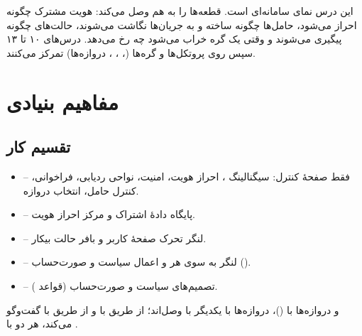 \documentclass[11pt,a4paper]{article}
\begin{document}
این درس نمای سامانه‌ای  است. قطعه‌ها را به هم وصل می‌کند: هویت مشترک چگونه احراز می‌شود، حامل‌ها چگونه
ساخته و به جریان‌ها نگاشت می‌شوند، حالت‌های  چگونه پیگیری می‌شوند و وقتی یک گره خراب می‌شود چه رخ می‌دهد.
درس‌های ۱۰ تا ۱۳ سپس روی پروتکل‌ها و گره‌ها (، ، ، دروازه‌ها) تمرکز می‌کنند.

\section{مفاهیم بنیادی}

\subsection{تقسیم کار}
\begin{itemize}
  \item \textbf{} -- فقط صفحهٔ کنترل: سیگنالینگ ، احراز هویت، امنیت، نواحی ردیابی، فراخوانی، کنترل
        حامل، انتخاب دروازه.
  \item \textbf{} -- پایگاه دادهٔ اشتراک و مرکز احراز هویت.
  \item \textbf{} -- لنگر تحرک صفحهٔ کاربر و بافر حالت بیکار.
  \item \textbf{} -- لنگر  به سوی هر  و اعمال سیاست و صورت‌حساب ().
  \item \textbf{} -- تصمیم‌های سیاست و صورت‌حساب (قواعد ).
\end{itemize}
 و دروازه‌ها با  ()، دروازه‌ها با یکدیگر با  وصل‌اند؛  از طریق 
با  و  از طریق  با  گفت‌وگو می‌کند، هر دو با .
\end{document}
